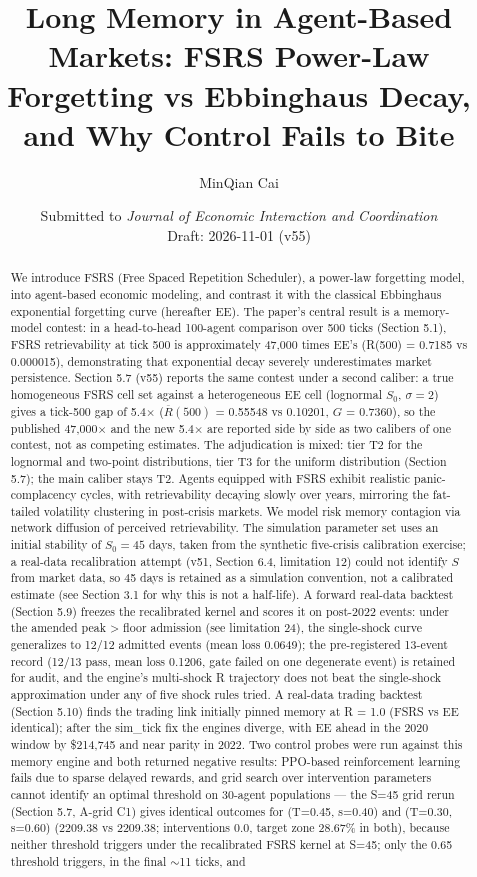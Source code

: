 \documentclass[11pt]{article}
\title{Long Memory in Agent-Based Markets: FSRS Power-Law Forgetting vs Ebbinghaus Decay, and Why Control Fails to Bite}
\author{MinQian Cai}
\date{Submitted to \textit{Journal of Economic Interaction and Coordination} \\Draft: 2026-11-01 (v55)}
\begin{document}
\maketitle

\begin{abstract}
We introduce FSRS (Free Spaced Repetition Scheduler), a power-law forgetting model, into agent-based economic modeling, and contrast it with the classical Ebbinghaus exponential forgetting curve (hereafter EE). The paper's central result is a memory-model contest: in a head-to-head 100-agent comparison over 500 ticks (Section 5.1), FSRS retrievability at tick 500 is approximately 47,000 times EE's (R(500) = 0.7185 vs 0.000015), demonstrating that exponential decay severely underestimates market persistence. Section 5.7 (v55) reports the same contest under a second caliber: a true homogeneous FSRS cell set against a heterogeneous EE cell (lognormal $S_0$, $\sigma=2$) gives a tick-500 gap of 5.4$\times$ ($\overline{R}(500)$ = 0.55548 vs 0.10201, $G$ = 0.7360), so the published 47,000$\times$ and the new 5.4$\times$ are reported side by side as two calibers of one contest, not as competing estimates. The adjudication is mixed: tier T2 for the lognormal and two-point distributions, tier T3 for the uniform distribution (Section 5.7); the main caliber stays T2. Agents equipped with FSRS exhibit realistic panic-complacency cycles, with retrievability decaying slowly over years, mirroring the fat-tailed volatility clustering in post-crisis markets. We model risk memory contagion via network diffusion of perceived retrievability. The simulation parameter set uses an initial stability of $S_0 = 45$ days, taken from the synthetic five-crisis calibration exercise; a real-data recalibration attempt (v51, Section 6.4, limitation 12) could not identify $S$ from market data, so 45 days is retained as a simulation convention, not a calibrated estimate (see Section 3.1 for why this is not a half-life). A forward real-data backtest (Section 5.9) freezes the recalibrated kernel and scores it on post-2022 events: under the amended peak > floor admission (see limitation 24), the single-shock curve generalizes to 12/12 admitted events (mean loss 0.0649); the pre-registered 13-event record (12/13 pass, mean loss 0.1206, gate failed on one degenerate event) is retained for audit, and the engine's multi-shock R trajectory does not beat the single-shock approximation under any of five shock rules tried. A real-data trading backtest (Section 5.10) finds the trading link initially pinned memory at R = 1.0 (FSRS vs EE identical); after the sim\_tick fix the engines diverge, with EE ahead in the 2020 window by \$214,745 and near parity in 2022. Two control probes were run against this memory engine and both returned negative results: PPO-based reinforcement learning fails due to sparse delayed rewards, and grid search over intervention parameters cannot identify an optimal threshold on 30-agent populations --- the S=45 grid rerun (Section 5.7, A-grid C1) gives identical outcomes for (T=0.45, s=0.40) and (T=0.30, s=0.60) (2209.38 vs 2209.38; interventions 0.0, target zone 28.67\% in both), because neither threshold triggers under the recalibrated FSRS kernel at S=45; only the 0.65 threshold triggers, in the final $\sim$11 ticks, and 
\end{abstract}
\end{document}

